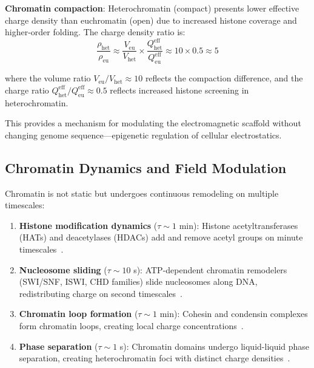 \documentclass[twocolumn,10pt,aps,prd,superscriptaddress,floatfix,nofootinbib]{revtex4-2}
\theoremstyle{remark}
\begin{document}
\textbf{Chromatin compaction}: Heterochromatin (compact) presents lower effective charge density than euchromatin (open) due to increased histone coverage and higher-order folding. The charge density ratio is:
\begin{equation}
\frac{\rho_{\mathrm{het}}}{\rho_{\mathrm{eu}}} \approx \frac{V_{\mathrm{eu}}}{V_{\mathrm{het}}} \times \frac{Q_{\mathrm{het}}^{\mathrm{eff}}}{Q_{\mathrm{eu}}^{\mathrm{eff}}} \approx 10 \times 0.5 \approx 5
\end{equation}

where the volume ratio $V_{\mathrm{eu}}/V_{\mathrm{het}} \approx 10$ reflects the compaction difference, and the charge ratio $Q_{\mathrm{het}}^{\mathrm{eff}}/Q_{\mathrm{eu}}^{\mathrm{eff}} \approx 0.5$ reflects increased histone screening in heterochromatin.

This provides a mechanism for modulating the electromagnetic scaffold without changing genome sequence---epigenetic regulation of cellular electrostatics.

\subsection{Chromatin Dynamics and Field Modulation}

Chromatin is not static but undergoes continuous remodeling on multiple timescales:

\begin{enumerate}
\item \textbf{Histone modification dynamics} ($\tau \sim 1$ min): Histone acetyltransferases (HATs) and deacetylases (HDACs) add and remove acetyl groups on minute timescales~\cite{Katan-Khaykovich2002}.

\item \textbf{Nucleosome sliding} ($\tau \sim 10$ s): ATP-dependent chromatin remodelers (SWI/SNF, ISWI, CHD families) slide nucleosomes along DNA, redistributing charge on second timescales~\cite{Clapier2017}.

\item \textbf{Chromatin loop formation} ($\tau \sim 1$ min): Cohesin and condensin complexes form chromatin loops, creating local charge concentrations~\cite{Dekker2017}.

\item \textbf{Phase separation} ($\tau \sim 1$ s): Chromatin domains undergo liquid-liquid phase separation, creating heterochromatin foci with distinct charge densities~\cite{Strom2017}.
\end{enumerate}
\end{document}
